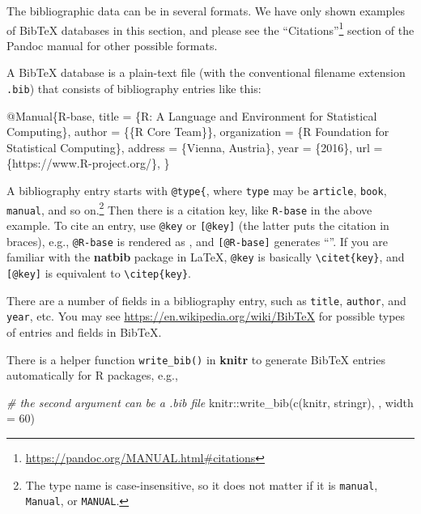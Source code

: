 \documentclass[
  12pt,
]{krantz}
\newenvironment{Shaded}{\begin{snugshade}}{\end{snugshade}}
\newcommand{\AttributeTok}[1]{\textcolor[rgb]{0.77,0.63,0.00}{#1}}
\newcommand{\CommentTok}[1]{\textcolor[rgb]{0.56,0.35,0.01}{\textit{#1}}}
\newcommand{\DataTypeTok}[1]{\textcolor[rgb]{0.13,0.29,0.53}{#1}}
\newcommand{\DecValTok}[1]{\textcolor[rgb]{0.00,0.00,0.81}{#1}}
\newcommand{\FunctionTok}[1]{\textcolor[rgb]{0.00,0.00,0.00}{#1}}
\newcommand{\NormalTok}[1]{#1}
\newcommand{\OtherTok}[1]{\textcolor[rgb]{0.56,0.35,0.01}{#1}}
\newcommand{\SpecialCharTok}[1]{\textcolor[rgb]{0.00,0.00,0.00}{#1}}
\newcommand{\StringTok}[1]{\textcolor[rgb]{0.31,0.60,0.02}{#1}}
\newcommand{\VariableTok}[1]{\textcolor[rgb]{0.00,0.00,0.00}{#1}}
\renewcommand{\href}[2]{#2\footnote{\url{#1}}}
\theoremstyle{definition}
\theoremstyle{definition}
\theoremstyle{definition}
\theoremstyle{definition}
\theoremstyle{remark}
\begin{document}
The bibliographic data can be in several formats. We have only shown examples of BibTeX databases in this section, and please see the \href{https://pandoc.org/MANUAL.html\#citations}{``Citations''} section of the Pandoc manual for other possible formats.

A BibTeX database is a plain-text file (with the conventional filename extension \texttt{.bib}) that consists of bibliography entries like this:

\begin{Shaded}
\begin{Highlighting}[]
\VariableTok{@Manual}\NormalTok{\{}\OtherTok{R}\NormalTok{{-}}\OtherTok{base}\NormalTok{,}
  \DataTypeTok{title}\NormalTok{ = \{R: A Language and Environment for Statistical}
\NormalTok{    Computing\},}
  \DataTypeTok{author}\NormalTok{ = \{\{R Core Team\}\},}
  \DataTypeTok{organization}\NormalTok{ = \{R Foundation for Statistical Computing\},}
  \DataTypeTok{address}\NormalTok{ = \{Vienna, Austria\},}
  \DataTypeTok{year}\NormalTok{ = \{2016\},}
  \DataTypeTok{url}\NormalTok{ = \{https://www.R{-}project.org/\},}
\NormalTok{\}}
\end{Highlighting}
\end{Shaded}

A bibliography entry starts with \texttt{@type\{}, where \texttt{type} may be \texttt{article}, \texttt{book}, \texttt{manual}, and so on.\footnote{The type name is case-insensitive, so it does not matter if it is \texttt{manual}, \texttt{Manual}, or \texttt{MANUAL}.} Then there is a citation key, like \texttt{R-base} in the above example. To cite an entry, use \texttt{@key} or \texttt{{[}@key{]}} (the latter puts the citation in braces), e.g., \texttt{@R-base} is rendered as \citet{R-base}, and \texttt{{[}@R-base{]}} generates ``\citep{R-base}''. If you are familiar with the \textbf{natbib} package in LaTeX, \texttt{@key} is basically \texttt{\textbackslash{}citet\{key\}}, and \texttt{{[}@key{]}} is equivalent to \texttt{\textbackslash{}citep\{key\}}.

There are a number of fields in a bibliography entry, such as \texttt{title}, \texttt{author}, and \texttt{year}, etc. You may see \url{https://en.wikipedia.org/wiki/BibTeX} for possible types of entries and fields in BibTeX.

There is a helper function \texttt{write\_bib()} in \textbf{knitr} to generate BibTeX entries automatically for R packages, e.g.,

\begin{Shaded}
\begin{Highlighting}[]
\CommentTok{\# the second argument can be a .bib file}
\NormalTok{knitr}\SpecialCharTok{::}\FunctionTok{write\_bib}\NormalTok{(}\FunctionTok{c}\NormalTok{(}\StringTok{\textquotesingle{}knitr\textquotesingle{}}\NormalTok{, }\StringTok{\textquotesingle{}stringr\textquotesingle{}}\NormalTok{), }\StringTok{\textquotesingle{}\textquotesingle{}}\NormalTok{, }\AttributeTok{width =} \DecValTok{60}\NormalTok{)}
\end{Highlighting}
\end{Shaded}
\end{document}
